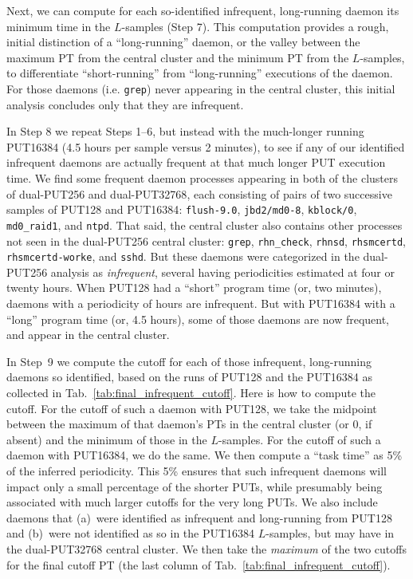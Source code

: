 \documentclass[letter]{ieice}
\begin{document}
Next, we can compute for each so-identified infrequent, long-running daemon its
minimum time in the \hbox{$L$-samples} (Step 7). 
This computation provides a rough, initial distinction of a ``long-running''
daemon, or the valley between the maximum PT from the central cluster 
and the minimum PT from the $L$-samples, to differentiate ``short-running'' 
from ``\hbox{long-running}'' executions of the daemon. 
For those daemons (i.e. {\tt grep}) never appearing in the central cluster,
this initial analysis concludes only that they are infrequent.

In Step 8 we repeat Steps 1--6, but instead with the much-longer running
PUT16384 (4.5 hours per \hbox{sample} versus 2 minutes), to see 
if any of our identified \hbox{infrequent} daemons are actually frequent 
at that much longer PUT execution time. 
We find some frequent daemon processes appearing in both of the 
clusters of dual-PUT256 and dual-PUT32768{\color{blue}, each consisting of 
pairs of two successive samples of PUT128 and PUT16384}: 
{\tt flush-9.0}, {\tt jbd2/md0-8}, {\tt kblock/0}, {\tt md0\_raid1}, 
and {\tt ntpd}. That said, the central cluster also contains other
  processes not seen in the \hbox{dual-PUT256} central cluster: 
  {\tt grep}, {\tt rhn\_check}, {\tt rhnsd}, {\tt rhsmcertd}, 
  {\tt rhsmcertd-worke}, and {\tt sshd}. 
  But these daemons were categorized in the \hbox{dual-PUT256} analysis as {\em
  infrequent}, several having \hbox{periodicities} estimated at four or twenty hours.
When {\color{blue}PUT128} had a ``short'' 
program time (or, two minutes), daemons with a periodicity of
hours are \hbox{infrequent}. But with {\color{blue}PUT16384} 
with a ``long'' program time (or, 4.5 hours), some of those daemons are now frequent, and appear in the central cluster.

In Step~9 we compute 
the cutoff for each of those infrequent, long-running daemons so
identified, based on the runs of PUT128 and the 
PUT16384 as collected in Tab.~\ref{tab:final_infrequent_cutoff}. 
Here is how to compute the cutoff. For the cutoff of such a daemon with PUT128, 
we take the \hbox{midpoint} between the maximum of that daemon's PTs in the 
central cluster (or 0, if absent) and the \hbox{minimum} of those in the $L$-samples. 
For the cutoff of such a daemon with PUT16384, we do the same. 
We then compute a ``task time'' as 5\% of the inferred periodicity. 
This 5\% ensures that such infrequent daemons will impact 
only a small percentage of the shorter PUTs, while presumably being 
associated with much larger cutoffs for the very long PUTs. 
We also include daemons that (a)~were identified as infrequent and 
\hbox{long-running} from PUT128 and (b)~were not identified as so in the PUT16384 
\hbox{$L$-samples}, but may have in the \hbox{dual-PUT32768} central cluster.
We then take the {\em maximum} of the two cutoffs for the final cutoff PT 
(the last column of Tab.~\ref{tab:final_infrequent_cutoff}). 
\end{document}
